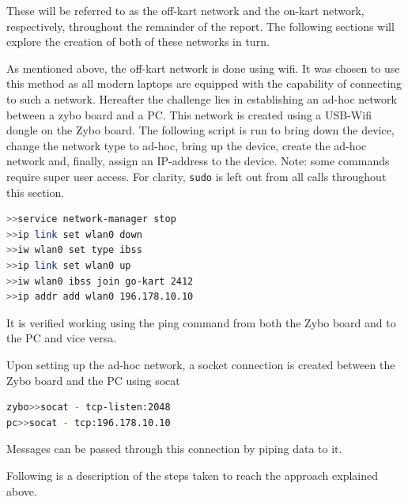 These will be referred to as the off-kart network and the on-kart network, respectively, throughout the remainder of the report.
The following sections will explore the creation of both of these networks in turn.


As mentioned above, the off-kart network is done using wifi.
It was chosen to use this method as all modern laptops are equipped with the capability of connecting to such a network.
Hereafter the challenge lies in establishing an ad-hoc network between a zybo board and a PC.
This network is created using a USB-Wifi dongle on the Zybo board. 
The following script is run to bring down the device, change the network type to ad-hoc, bring up the device, create the ad-hoc network and, finally, assign an IP-address to the device.
Note: some commands require super user access.
For clarity, \texttt{sudo} is left out from all calls throughout this section.
\begin{lstlisting}[language=bash]
>>service network-manager stop
>>ip link set wlan0 down
>>iw wlan0 set type ibss
>>ip link set wlan0 up
>>iw wlan0 ibss join go-kart 2412
>>ip addr add wlan0 196.178.10.10
\end{lstlisting}
It is verified working using the ping command from both the Zybo board and to the PC and vice versa.

Upon setting up the ad-hoc network, a socket connection is created between the Zybo board and the PC using socat
\begin{lstlisting}[language=bash]
zybo>>socat - tcp-listen:2048
pc>>socat - tcp:196.178.10.10
\end{lstlisting}

Messages can be passed through this connection by piping data to it.

Following is a description of the steps taken to reach the approach explained above.
